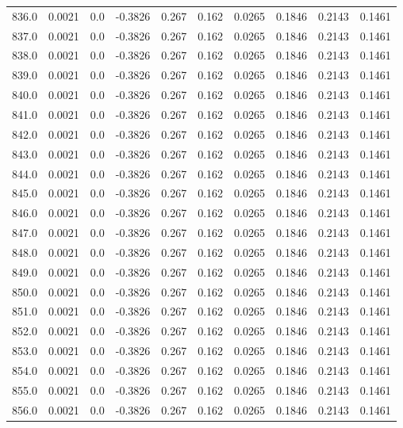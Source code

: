 \begin{longtable}{lrrrrrrrrr}
836.0 & 0.0021 & 0.0 & -0.3826 & 0.267 & 0.162 & 0.0265 & 0.1846 & 0.2143 & 0.1461 \\
837.0 & 0.0021 & 0.0 & -0.3826 & 0.267 & 0.162 & 0.0265 & 0.1846 & 0.2143 & 0.1461 \\
838.0 & 0.0021 & 0.0 & -0.3826 & 0.267 & 0.162 & 0.0265 & 0.1846 & 0.2143 & 0.1461 \\
839.0 & 0.0021 & 0.0 & -0.3826 & 0.267 & 0.162 & 0.0265 & 0.1846 & 0.2143 & 0.1461 \\
840.0 & 0.0021 & 0.0 & -0.3826 & 0.267 & 0.162 & 0.0265 & 0.1846 & 0.2143 & 0.1461 \\
841.0 & 0.0021 & 0.0 & -0.3826 & 0.267 & 0.162 & 0.0265 & 0.1846 & 0.2143 & 0.1461 \\
842.0 & 0.0021 & 0.0 & -0.3826 & 0.267 & 0.162 & 0.0265 & 0.1846 & 0.2143 & 0.1461 \\
843.0 & 0.0021 & 0.0 & -0.3826 & 0.267 & 0.162 & 0.0265 & 0.1846 & 0.2143 & 0.1461 \\
844.0 & 0.0021 & 0.0 & -0.3826 & 0.267 & 0.162 & 0.0265 & 0.1846 & 0.2143 & 0.1461 \\
845.0 & 0.0021 & 0.0 & -0.3826 & 0.267 & 0.162 & 0.0265 & 0.1846 & 0.2143 & 0.1461 \\
846.0 & 0.0021 & 0.0 & -0.3826 & 0.267 & 0.162 & 0.0265 & 0.1846 & 0.2143 & 0.1461 \\
847.0 & 0.0021 & 0.0 & -0.3826 & 0.267 & 0.162 & 0.0265 & 0.1846 & 0.2143 & 0.1461 \\
848.0 & 0.0021 & 0.0 & -0.3826 & 0.267 & 0.162 & 0.0265 & 0.1846 & 0.2143 & 0.1461 \\
849.0 & 0.0021 & 0.0 & -0.3826 & 0.267 & 0.162 & 0.0265 & 0.1846 & 0.2143 & 0.1461 \\
850.0 & 0.0021 & 0.0 & -0.3826 & 0.267 & 0.162 & 0.0265 & 0.1846 & 0.2143 & 0.1461 \\
851.0 & 0.0021 & 0.0 & -0.3826 & 0.267 & 0.162 & 0.0265 & 0.1846 & 0.2143 & 0.1461 \\
852.0 & 0.0021 & 0.0 & -0.3826 & 0.267 & 0.162 & 0.0265 & 0.1846 & 0.2143 & 0.1461 \\
853.0 & 0.0021 & 0.0 & -0.3826 & 0.267 & 0.162 & 0.0265 & 0.1846 & 0.2143 & 0.1461 \\
854.0 & 0.0021 & 0.0 & -0.3826 & 0.267 & 0.162 & 0.0265 & 0.1846 & 0.2143 & 0.1461 \\
855.0 & 0.0021 & 0.0 & -0.3826 & 0.267 & 0.162 & 0.0265 & 0.1846 & 0.2143 & 0.1461 \\
856.0 & 0.0021 & 0.0 & -0.3826 & 0.267 & 0.162 & 0.0265 & 0.1846 & 0.2143 & 0.1461 \\

\end{longtable}
